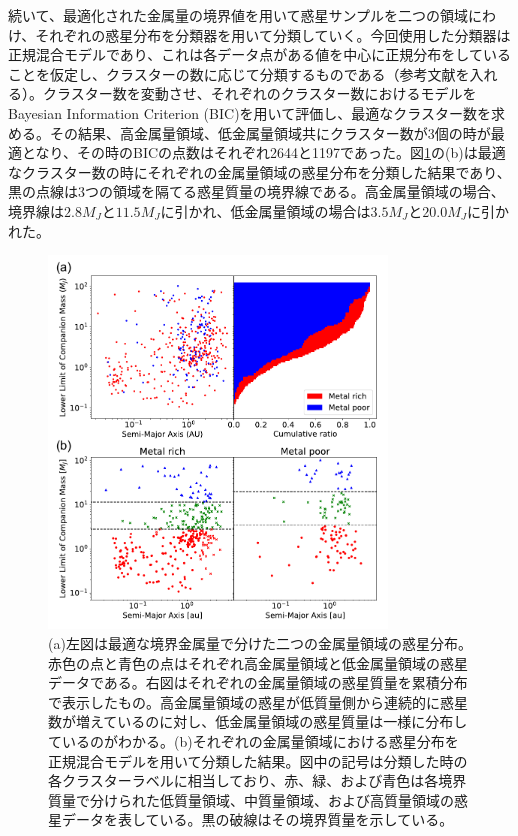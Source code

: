 \documentclass[twocolumn, dvipdfmx]{aastex62}
\begin{document}
\begin{CJK*}{UTF8}{min}
続いて、最適化された金属量の境界値を用いて惑星サンプルを二つの領域にわけ、それぞれの惑星分布を分類器を用いて分類していく。今回使用した分類器は正規混合モデルであり、これは各データ点がある値を中心に正規分布をしていることを仮定し、クラスターの数に応じて分類するものである（参考文献を入れる）。クラスター数を変動させ、それぞれのクラスター数におけるモデルをBayesian Information Criterion (BIC)を用いて評価し、最適なクラスター数を求める。その結果、高金属量領域、低金属量領域共にクラスター数が3個の時が最適となり、その時のBICの点数はそれぞれ2644と1197であった。図\ref{fig:a_Mp}の(b)は最適なクラスター数の時にそれぞれの金属量領域の惑星分布を分類した結果であり、黒の点線は3つの領域を隔てる惑星質量の境界線である。高金属量領域の場合、境界線は$2.8 M_J$と$11.5 M_J$に引かれ、低金属量領域の場合は$3.5 M_J$と$20.0 M_J$に引かれた。

\begin{figure}[t]
\begin{center}
\includegraphics[width=9cm]{../../../Figure/a_Mp.pdf}
\caption{(a)左図は最適な境界金属量で分けた二つの金属量領域の惑星分布。赤色の点と青色の点はそれぞれ高金属量領域と低金属量領域の惑星データである。右図はそれぞれの金属量領域の惑星質量を累積分布で表示したもの。高金属量領域の惑星が低質量側から連続的に惑星数が増えているのに対し、低金属量領域の惑星質量は一様に分布しているのがわかる。(b)それぞれの金属量領域における惑星分布を正規混合モデルを用いて分類した結果。図中の記号は分類した時の各クラスターラベルに相当しており、赤、緑、および青色は各境界質量で分けられた低質量領域、中質量領域、および高質量領域の惑星データを表している。黒の破線はその境界質量を示している。\label{fig:a_Mp}}
\end{center}
\end{figure}



\end{CJK*}
\end{document}
